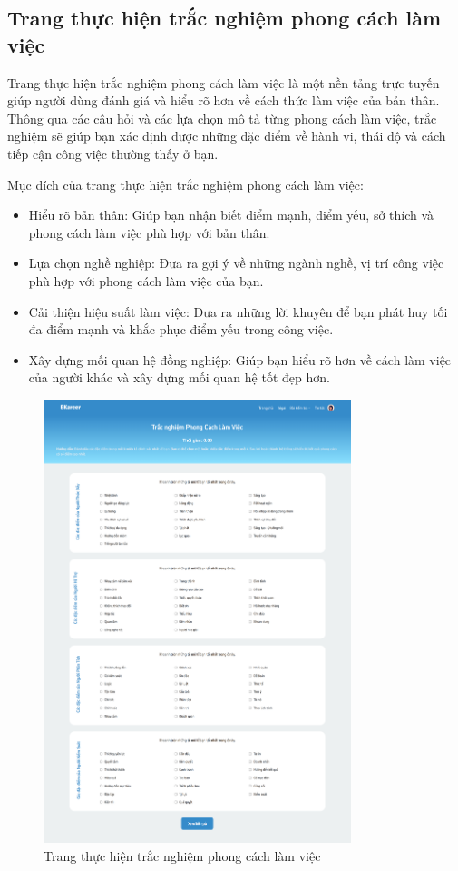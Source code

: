 \subsection{Trang thực hiện trắc nghiệm phong cách làm việc}
Trang thực hiện trắc nghiệm phong cách làm việc là một nền tảng trực tuyến giúp người dùng đánh giá và hiểu rõ hơn về cách thức làm việc của bản thân. Thông qua các câu hỏi và các lựa chọn mô tả từng phong cách làm việc, trắc nghiệm sẽ giúp bạn xác định được những đặc điểm về hành vi, thái độ và cách tiếp cận công việc thường thấy ở bạn.

Mục đích của trang thực hiện trắc nghiệm phong cách làm việc:
\begin{itemize}
    \item Hiểu rõ bản thân: Giúp bạn nhận biết điểm mạnh, điểm yếu, sở thích và phong cách làm việc phù hợp với bản thân.
    \item Lựa chọn nghề nghiệp: Đưa ra gợi ý về những ngành nghề, vị trí công việc phù hợp với phong cách làm việc của bạn.
    \item Cải thiện hiệu suất làm việc: Đưa ra những lời khuyên để bạn phát huy tối đa điểm mạnh và khắc phục điểm yếu trong công việc.
    \item Xây dựng mối quan hệ đồng nghiệp: Giúp bạn hiểu rõ hơn về cách làm việc của người khác và xây dựng mối quan hệ tốt đẹp hơn.
\end{itemize}

\begin{figure}[H]
    \centering
    \includegraphics[width=0.8\textwidth]
    {images/chap5/workStyle.png}
    \vspace{0.5cm}
    \caption{Trang thực hiện trắc nghiệm phong cách làm việc}
\end{figure}


